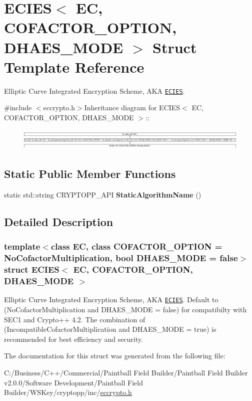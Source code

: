 \hypertarget{struct_e_c_i_e_s}{
\section{ECIES$<$ EC, COFACTOR\_\-OPTION, DHAES\_\-MODE $>$ Struct Template Reference}
\label{struct_e_c_i_e_s}
}


Elliptic Curve Integrated Encryption Scheme, AKA \href{http://www.weidai.com/scan-mirror/ca.html#ECIES}{\tt ECIES}.  


{\ttfamily \#include $<$eccrypto.h$>$}Inheritance diagram for ECIES$<$ EC, COFACTOR\_\-OPTION, DHAES\_\-MODE $>$::\begin{figure}[H]
\begin{center}
\leavevmode
\includegraphics[height=1.05197cm]{struct_e_c_i_e_s}
\end{center}
\end{figure}
\subsection*{Static Public Member Functions}
\begin{DoxyCompactItemize}
\item 
\hypertarget{struct_e_c_i_e_s_a92707c22bdecd808c9d066cd217bbff6}{
static std::string CRYPTOPP\_\-API {\bfseries StaticAlgorithmName} ()}
\label{struct_e_c_i_e_s_a92707c22bdecd808c9d066cd217bbff6}

\end{DoxyCompactItemize}


\subsection{Detailed Description}
\subsubsection*{template$<$class EC, class COFACTOR\_\-OPTION = NoCofactorMultiplication, bool DHAES\_\-MODE = false$>$ struct ECIES$<$ EC, COFACTOR\_\-OPTION, DHAES\_\-MODE $>$}

Elliptic Curve Integrated Encryption Scheme, AKA \href{http://www.weidai.com/scan-mirror/ca.html#ECIES}{\tt ECIES}. Default to (NoCofactorMultiplication and DHAES\_\-MODE = false) for compatibilty with SEC1 and Crypto++ 4.2. The combination of (IncompatibleCofactorMultiplication and DHAES\_\-MODE = true) is recommended for best efficiency and security. 

The documentation for this struct was generated from the following file:\begin{DoxyCompactItemize}
\item 
C:/Business/C++/Commercial/Paintball Field Builder/Paintball Field Builder v2.0.0/Software Development/Paintball Field Builder/WSKey/cryptopp/inc/\hyperlink{eccrypto_8h}{eccrypto.h}\end{DoxyCompactItemize}

